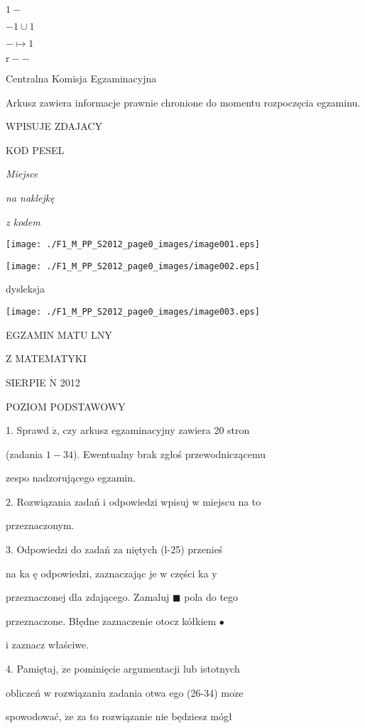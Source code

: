 \documentclass[a4paper,12pt]{article}
\begin{document}
$1-$

$-1\cup 1$

$-\mapsto 1$

$\mathrm{r}--$

Centralna Komisja Egzaminacyjna

Arkusz zawiera informacje prawnie chronione do momentu rozpoczęcia egzaminu.

WPISUJE ZDAJACY

KOD PESEL

{\it Miejsce}

{\it na naklejkę}

{\it z kodem}
\begin{center}
\texttt{[image: ./F1\_M\_PP\_S2012\_page0\_images/image001.eps]}

\texttt{[image: ./F1\_M\_PP\_S2012\_page0\_images/image002.eps]}
\end{center}
\fbox{} dysleksja
\begin{center}
\texttt{[image: ./F1\_M\_PP\_S2012\_page0\_images/image003.eps]}
\end{center}
EGZAMIN MATU LNY

Z MATEMATYKI

SIERPIE $\acute{\mathrm{N}}$ 2012

POZIOM PODSTAWOWY

1. Sprawd $\acute{\mathrm{z}}$, czy arkusz egzaminacyjny zawiera 20 stron

(zadania $1-34$). Ewentualny brak zgłoś przewodniczącemu

zespo nadzorującego egzamin.

2. Rozwiązania zadań i odpowiedzi wpisuj w miejscu na to

przeznaczonym.

3. Odpowiedzi do zadań za niętych (l-25) przenieś

na ka ę odpowiedzi, zaznaczając je w części ka $\mathrm{y}$

przeznaczonej dla zdającego. Zamaluj $\blacksquare$ pola do tego

przeznaczone. Błędne zaznaczenie otocz kółkiem \fcircle$\bullet$

i zaznacz właściwe.

4. Pamiętaj, $\dot{\mathrm{z}}\mathrm{e}$ pominięcie argumentacji lub istotnych

obliczeń w rozwiązaniu zadania otwa ego (26-34) $\mathrm{m}\mathrm{o}\dot{\mathrm{z}}\mathrm{e}$

spowodować, $\dot{\mathrm{z}}\mathrm{e}$ za to rozwiązanie nie będziesz mógł
\end{document}
